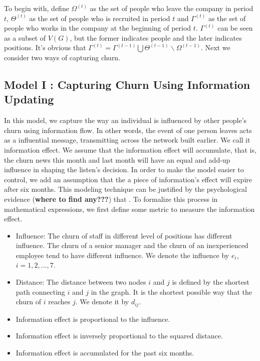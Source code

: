 \documentclass[tcn = 37075, sheet = true, abstract = true]{mcmthesis}
\begin{document}
To begin with, define $\Omega^{(t)}$ as the set of people who leave the company in period $t$, $\Theta^{(t)}$ as the set of people who is recruited in period $t$ and $\Gamma^{(t)}$ as the set of people who works in the company at the beginning of period $t$. $\Gamma^{(t)}$ can be seen as a subset of $V(G)$, but the former indicates people and the later indicates positions. It's obvious that $\Gamma^{(t)}=\Gamma^{(t-1)}\bigcup \Theta ^{(t-1)} \backslash \Omega^{(t-1)}$. Next we consider two ways of capturing churn.

\subsection{Model I : Capturing Churn Using Information Updating}

In this model, we capture the way an individual is influenced by other people's churn using information flow. In other words, the event of one person leaves acts as a influential message, transmitting across the network built earlier. We call it information effect. We assume that the information effect will accumulate, that is, the churn news this month and last month will have an equal and add-up influence in shaping the listen's decision. In order to make the model easier to control, we add an assumption that the a piece of information's effect will expire after six months. This modeling technique can be justified by the psychological evidence (\textbf{where to find any???}) that . To formalize this process in mathematical expressions, we first define some metric to measure the information effect. 

\begin{itemize}
\item Influence: The churn of staff in different level of positions has different influence. The churn of a senior manager and the churn of an inexperienced employee tend to have different influence. We denote the influence by $e_i$, $i=1,2,...,7$.
\item Distance: The distance between two nodes $i$ and $j$ is defined by the shortest path connecting $i$ and $j$ in the graph. It is the shortest possible way that the churn of $i$ reaches $j$. We denote it by $d_{ij}$.
\item Information effect is proportional to the influence.
\item Information effect is inversely proportional to the squared distance.
\item Information effect is accumulated for the past six months.
\end{itemize}
\end{document}
